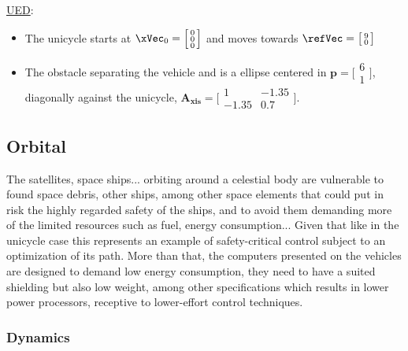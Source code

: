 \underline{UED}:
\label{ssssec:UED} %
\begin{itemize}
  \item The unicycle starts at \(\xVec_0 = \Bigl[\begin{smallmatrix} 0 \\ 0 \\ 0 \end{smallmatrix}\Bigr]\) and moves towards  \(\refVec = \bigl[\begin{smallmatrix} 9 \\ 0 \end{smallmatrix}\bigr]\)
  \item The obstacle separating the vehicle and \txtref is a ellipse centered in \(\mathbf{p} = \bigl[\begin{smallmatrix} 6 \\ 1 \end{smallmatrix}\bigr] \), diagonally against the unicycle, \(\mathbf{A_{xis}} = \bigl[\begin{smallmatrix} 1 & -1.35\\ -1.35 & 0.7\end{smallmatrix}\bigr]\).
\end{itemize}



\subsection{Orbital}
\label{subsec:orbital_simul_setup}

The satellites, space ships... orbiting around a celestial body are vulnerable to found space debris, other ships, among other space elements that could put in risk the highly regarded safety of the ships, and to avoid them demanding more of the limited resources such as fuel, energy consumption... Given that like in the unicycle case this represents an example of safety-critical control subject to an optimization of its path.  More than that, the computers presented on the vehicles are designed to demand low energy consumption, they need to have a suited shielding but also low weight, among other specifications which results in lower power processors, receptive to lower-effort control techniques.     

\subsubsection{Dynamics}
\label{subsubsec:orbital_dynamics}

